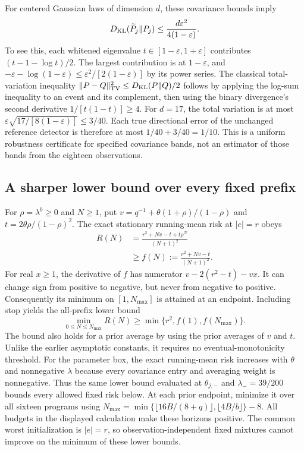 For centered Gaussian laws of dimension $d$, these covariance bounds imply
\[
D_{\rm KL}(\widetilde P_j\|P_j)
\le\frac{d\varepsilon^2}{4(1-\varepsilon)}.
\]
To see this, each whitened eigenvalue $t\in[1-\varepsilon,1+\varepsilon]$ contributes $(t-1-\log t)/2$.
The largest contribution is at $1-\varepsilon$, and $-\varepsilon-\log(1-\varepsilon)\le\varepsilon^2/[2(1-\varepsilon)]$ by its power series.
The classical total-variation inequality $\|P-Q\|_{\rm TV}^2\le D_{\rm KL}(P\|Q)/2$ follows by applying the log-sum inequality to an event and its complement, then using the binary divergence's second derivative $1/[t(1-t)]\ge4$.
For $d=17$, the total variation is at most $\varepsilon\sqrt{17/[8(1-\varepsilon)]}\le3/40$.
Each true directional error of the unchanged reference detector is therefore at most $1/40+3/40=1/10$.
This is a uniform robustness certificate for specified covariance bands, not an estimator of those bands from the eighteen observations.

\subsection{A sharper lower bound over every fixed prefix}
For $\rho=\lambda^b\ge0$ and $N\ge1$, put $v=q^{-1}+\theta(1+\rho)/(1-\rho)$ and $t=2\theta\rho/(1-\rho)^2$.
The exact stationary running-mean risk at $|e|=r$ obeys
\begin{align*}
R(N)&=\frac{r^2+Nv-t+t\rho^N}{(N+1)^2}\\
&\ge f(N):=\frac{r^2+Nv-t}{(N+1)^2}.
\end{align*}
For real $x\ge1$, the derivative of $f$ has numerator $v-2(r^2-t)-vx$.
It can change sign from positive to negative, but never from negative to positive.
Consequently its minimum on $[1,N_{\max}]$ is attained at an endpoint.
Including stop yields the all-prefix lower bound
\[
\min_{0\le N\le N_{\max}}R(N)\ge\min\{r^2,f(1),f(N_{\max})\}.
\]
The bound also holds for a prior average by using the prior averages of $v$ and $t$.
Unlike the earlier asymptotic constants, it requires no eventual-monotonicity threshold.
For the parameter box, the exact running-mean risk increases with $\theta$ and nonnegative $\lambda$ because every covariance entry and averaging weight is nonnegative.
Thus the same lower bound evaluated at $\theta_{j,-}$ and $\lambda_-=39/200$ bounds every allowed fixed risk below.
At each prior endpoint, minimize it over all sixteen programs using $N_{\max}=\min\{\lfloor16B/(8+q)\rfloor,\lfloor4B/b\rfloor\}-8$.
All budgets in the displayed calculation make these horizons positive.
The common worst initialization is $|e|=r$, so observation-independent fixed mixtures cannot improve on the minimum of these lower bounds.

